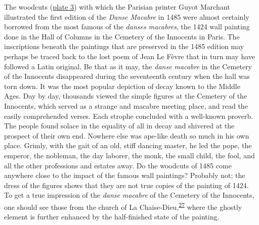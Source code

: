 The woodcuts
(\protect\hyperlink{20_ILLUSTRATIONS_FOLLOW_PAGE.xhtmlux5cux23id_4}{plate
3}) with which the Parisian printer Guyot Marchant illustrated the first
edition of the \emph{Danse Macabre} in 1485 were almost certainly
borrowed from the most famous of the \emph{danses macabres}, the 1424
wall painting done in the Hall of Columns in the Cemetery of the
Innocents in Paris. The inscriptions beneath the paintings that are
preserved in the 1485 edition may perhaps be traced back to the lost
poem of Jean Le Fèvre that in turn may have followed a Latin original.
Be that as it may, the \emph{danse macabre} in the Cemetery of the
Innocents disappeared during the seventeenth century when the hall was
torn down. It was the most popular depiction of decay known to the
Middle Ages. Day by day, thousands viewed the simple figures at the
Cemetery of the Innocents, which served as a strange and macabre meeting
place, and read the easily comprehended verses. Each strophe concluded
with a well-known proverb. The people found solace in the equality of
all in decay and shivered at the prospect of their own end. Nowhere else
was ape-like death so much in his own place. Grimly, with the gait of an
old, stiff dancing master, he led the pope, the
em\protect\hypertarget{12_Chapter_Five__THE_VISION_OF_DEAT.xhtmlux5cux23page_166}{}{}peror,
the nobleman, the day laborer, the monk, the small child, the fool, and
all the other professions and estates away. Do the woodcuts of 1485 come
anywhere close to the impact of the famous wall paintings? Probably not;
the dress of the figures shows that they are not true copies of the
painting of 1424. To get a true impression of the \emph{danse macabre}
of the Cemetery of the Innocents, one should see those from the church
of La
Chaise-Dieu,\textsuperscript{\protect\hypertarget{12_Chapter_Five__THE_VISION_OF_DEAT.xhtmlux5cux23id_1298}{\protect\hyperlink{23_NOTES.xhtmlux5cux23id_1299}{27}}}
where the ghostly element is further enhanced by the half-finished state
of the painting.

